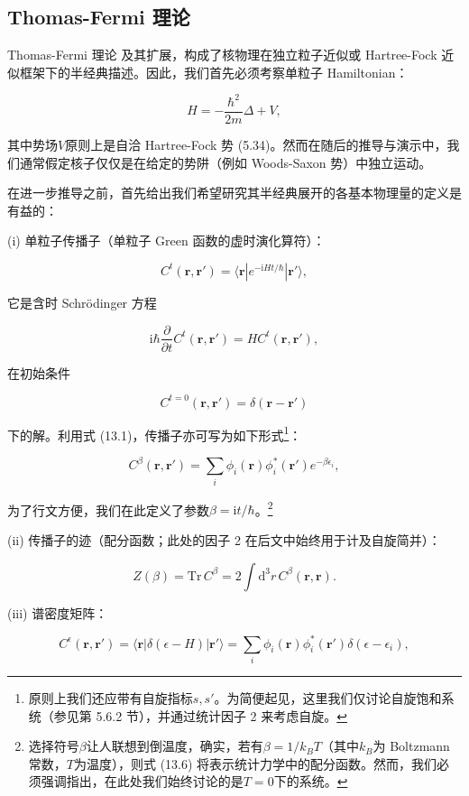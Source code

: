 \subsection{Thomas-Fermi 理论\label{subsec:13.2.1_Thomas-Fermi=007406=008BBA}}

Thomas-Fermi 理论 \cite{Th27,Fe28} 及其扩展，构成了核物理在独立粒子近似或 Hartree-Fock
近似框架下的半经典描述。因此，我们首先必须考察单粒子 Hamiltonian：

\[
H=-\frac{\hbar^{2}}{2m}\Delta+V,
\]

其中势场$V$原则上是自洽 Hartree-Fock 势 (5.34)。然而在随后的推导与演示中，我们通常假定核子仅仅是在给定的势阱（例如
Woods-Saxon 势）中独立运动。

在进一步推导之前，首先给出我们希望研究其半经典展开的各基本物理量的定义是有益的：

(i) 单粒子传播子（单粒子 Green 函数的虚时演化算符）：

\[
C^{t}(\boldsymbol{r},\boldsymbol{r}')=\langle\boldsymbol{r}|e^{-\mathrm{i}Ht/\hbar}|\boldsymbol{r}'\rangle,
\]

它是含时 Schrödinger 方程

\[
\mathrm{i}\hbar\frac{\partial}{\partial t}C^{t}(\boldsymbol{r},\boldsymbol{r}')=HC^{t}(\boldsymbol{r},\boldsymbol{r}'),
\]

在初始条件

\[
C^{t=0}(\boldsymbol{r},\boldsymbol{r}')=\delta(\boldsymbol{r}-\boldsymbol{r}')
\]

下的解。利用式 (13.1)，传播子亦可写为如下形式\footnote{原则上我们还应带有自旋指标$s,s'$。为简便起见，这里我们仅讨论自旋饱和系统（参见第 5.6.2 节），并通过统计因子 2 来考虑自旋。}：

\[
C^{\beta}(\boldsymbol{r},\boldsymbol{r}')=\sum_{i}\phi_{i}(\boldsymbol{r})\phi^{*}_{i}(\boldsymbol{r}')e^{-\beta\epsilon_{i}},
\]

为了行文方便，我们在此定义了参数$\beta=\mathrm{i}t/\hbar$。\footnote{选择符号$\beta$让人联想到倒温度，确实，若有$\beta=1/k_{B}T$（其中$k_{B}$为 Boltzmann
常数，$T$为温度），则式 (13.6) 将表示统计力学中的配分函数。然而，我们必须强调指出，在此处我们始终讨论的是$T=0$下的系统。}

(ii) 传播子的迹（配分函数；此处的因子 2 在后文中始终用于计及自旋简并）：

\[
Z(\beta)=\mathrm{Tr}\,C^{\beta}=2\int\mathrm{d}^{3}r\,C^{\beta}(\boldsymbol{r},\boldsymbol{r}).
\]

(iii) 谱密度矩阵：

\[
C^{\epsilon}(\boldsymbol{r},\boldsymbol{r}')=\langle\boldsymbol{r}|\delta(\epsilon-H)|\boldsymbol{r}'\rangle=\sum_{i}\phi_{i}(\boldsymbol{r})\phi^{*}_{i}(\boldsymbol{r}')\delta(\epsilon-\epsilon_{i}),
\]

